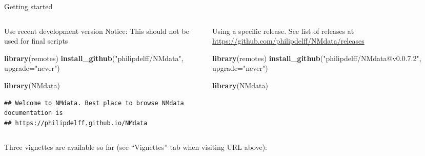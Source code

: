 \documentclass[
  8pt,
  ignorenonframetext,
  aspectratio=169]{beamer}
\newenvironment{Shaded}{\begin{snugshade}}{\end{snugshade}}
\newcommand{\DataTypeTok}[1]{\textcolor[rgb]{0.13,0.29,0.53}{#1}}
\newcommand{\KeywordTok}[1]{\textcolor[rgb]{0.13,0.29,0.53}{\textbf{#1}}}
\newcommand{\NormalTok}[1]{#1}
\newcommand{\StringTok}[1]{\textcolor[rgb]{0.31,0.60,0.02}{#1}}
\begin{document}
\begin{frame}[fragile]{Getting started}
\protect\hypertarget{getting-started}{}
\begin{columns}[T]
\begin{column}{0.48\textwidth}
Use recent development version Notice: This should not be used for final
scripts

\begin{Shaded}
\begin{Highlighting}[]
\KeywordTok{library}\NormalTok{(remotes)}
\KeywordTok{install\_github}\NormalTok{(}\StringTok{"philipdelff/NMdata"}\NormalTok{,}
               \DataTypeTok{upgrade=}\StringTok{"never"}\NormalTok{)}
\end{Highlighting}
\end{Shaded}

\begin{Shaded}
\begin{Highlighting}[]
\KeywordTok{library}\NormalTok{(NMdata)}
\end{Highlighting}
\end{Shaded}

\begin{verbatim}
## Welcome to NMdata. Best place to browse NMdata documentation is
## https://philipdelff.github.io/NMdata
\end{verbatim}
\end{column}

\begin{column}{0.48\textwidth}
Using a specific release. See list of releases at
\url{https://github.com/philipdelff/NMdata/releases}

\begin{Shaded}
\begin{Highlighting}[]
\KeywordTok{library}\NormalTok{(remotes)}
\KeywordTok{install\_github}\NormalTok{(}\StringTok{"philipdelff/NMdata@v0.0.7.2"}\NormalTok{,}
               \DataTypeTok{upgrade=}\StringTok{"never"}\NormalTok{)}
\end{Highlighting}
\end{Shaded}

\begin{Shaded}
\begin{Highlighting}[]
\KeywordTok{library}\NormalTok{(NMdata)}
\end{Highlighting}
\end{Shaded}
\end{column}
\end{columns}

Three vignettes are available so far (see ``Vignettes'' tab when
visiting URL above):


\end{frame}
\end{document}
